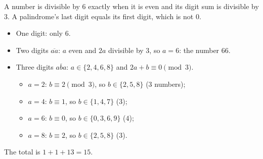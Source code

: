A number is divisible by $6$ exactly when it is even and its digit sum is divisible by $3$. A palindrome's last digit equals its first digit, which is not $0$.
\begin{itemize}
\item One digit: only $6$.
\item Two digits $\overline{aa}$: $a$ even and $2a$ divisible by $3$, so $a=6$: the number $66$.
\item Three digits $\overline{aba}$: $a\in\{2,4,6,8\}$ and $2a+b\equiv0\pmod3$.
\begin{itemize}
\item $a=2$: $b\equiv2\pmod 3$, so $b\in\{2,5,8\}$ ($3$ numbers);
\item $a=4$: $b\equiv1$, so $b\in\{1,4,7\}$ ($3$);
\item $a=6$: $b\equiv0$, so $b\in\{0,3,6,9\}$ ($4$);
\item $a=8$: $b\equiv2$, so $b\in\{2,5,8\}$ ($3$).
\end{itemize}
\end{itemize}
The total is $1+1+13=\boxed{15}$.
